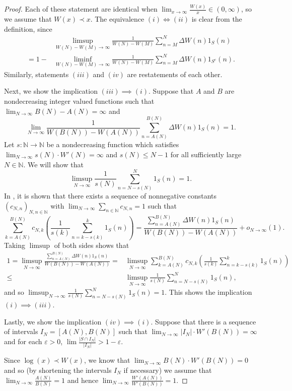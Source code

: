 \documentclass[12pt]{article}
\theoremstyle{plain} %
\theoremstyle{definition} %
\theoremstyle{plain}
\theoremstyle{plain}
\numberwithin{equation}{section}
\newcommand{\N}{\mathbb{N}}
\renewcommand{\epsilon}{\varepsilon}
\renewcommand{\leq}{\leqslant}
\newcommand{\1}{\mathbbm{1}}
\newcommand{\oo}{\infty}
\begin{document}
\begin{proof}
Each of these statement are identical when $\lim_{x\to\oo}\frac{W(x)}{x}\in(0,\oo)$, so we assume that $W(x)\prec x$. The equivalence $(i)\iff (ii)$ is clear from the definition, since 
    \begin{align*}
    &\limsup_{W(N)-W(M)\to\oo}\frac{1}{W(N)-W(M)}\sum_{n=M}^N\Delta W(n)1_{S}(n) \\
    = 1-&\liminf_{W(N)-W(M)\to\oo}\frac{1}{W(N)-W(M)}\sum_{n=M}^N\Delta W(n)1_{S^c}(n).
    \end{align*}
    Similarly, statements $(iii)$ and $(iv)$ are restatements of each other.
    
    Next, we show the implication $(iii)\implies (i)$.
     Suppose that $A$ and $B$ are nondecreasing integer valued functions such that $\lim_{N\to\oo}B(N)-A(N)=\oo$ and 
     $$
     \lim_{N\to\oo}\frac{1}{W(B(N))-W(A(N))}\sum_{n=A
(N)}^{B(N)}\Delta W(n)1_{S}(n)=1.
$$
Let $s:\N\rightarrow \N$  be a nondecreasing function which satisfies $\lim_{N\to\oo}s(N)\cdot  W'(N)=\oo$ and $s(N)\leq N-1$ for all sufficiently large $N\in \N$. We will show that 
$$
\limsup_{N\to\oo}\frac{1}{s(N)}\sum_{n=N-s(N)}^{N}1_S(n)=1.
$$
In \cite[Equation 4.2]{reilly26}, it is shown that there exists a sequence of nonnegative constants $(c_{N,n})_{N,n\in \N}$ with $\lim_{N\to\oo}\sum_{n\in \N}c_{N,n}=1$ such that 
\begin{equation}\label{eq:(4)_implies_(5)}
    \sum_{k=A(N)}^{B(N)}c_{N,k}\left(\frac{1}{s(k)}\sum_{n=k-s(k)}^k1_S(n)\right)=\frac{\sum_{n=A(N)}^{B(N)}\Delta W(n)1_{S}(n)}{W(B(N))-W(A(N))}+o_{N\to \oo}(1).
    \end{equation}
Taking $\limsup$ of both sides shows that 
\begin{align*}
    1= \limsup_{N\to\oo}\frac{\sum_{n=A(N)}^{B(N)}\Delta W(n)1_{S}(n)}{W(B(N))-W(A(N))} =& \limsup_{N\to\oo}\sum_{k=A(N)}^{B(N)}c_{N,k}\left(\frac{1}{s(k)}\sum_{n=k-s(k)}^k1_S(n)\right)\\
    \leq & \limsup_{N\to\oo}\frac{1}{s(N)}\sum_{n=N-s(N)}^N1_S(n),
\end{align*}
and so $\limsup_{N\to\oo}\frac{1}{s(N)}\sum_{n=N-s(N)}^N1_S(n)=1$. This shows the implication $(i)\implies (iii)$. 
    
    
    Lastly, we show the implication $(iv)\implies (i)$.
     Suppose that there is a sequence of intervals $I_N = [A(N),B(N)]$ such that $\lim_{N\to\oo}|I_N|\cdot W'(B(N))=\oo$ and for each $\epsilon>0$, $\lim \frac{|S\cap I_N|}{|I_N|}>1-\epsilon$.

     
Since $\log(x)\prec W(x)$, we know that $\lim_{N\to\oo}B(N)\cdot W'(B(N))=0$ and so (by shortening the intervals $I_N$ if necessary) we assume that $\lim_{N\to\oo}\frac{A(N)}{B(N)}=1$ and hence
$\lim_{N\to\oo}\frac{W'(A(N))}{W'(B(N))} = 1$.


\end{proof}
\end{document}

